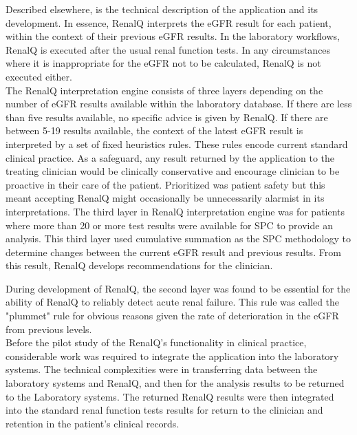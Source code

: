 \documentclass[11pt]{article}
\begin{document}
Described elsewhere, is the technical description of the application and its development\citep{GodfreyEtAl2014KidneyPaper}. In essence, RenalQ interprets the eGFR result for each patient, within the context of their previous eGFR results. In the laboratory workflows, RenalQ is executed after the usual renal function tests. In any circumstances where it is inappropriate for the eGFR not to be calculated, RenalQ is not executed either. \\

The RenalQ interpretation engine consists of three layers depending on the number of eGFR results available within the laboratory database. If there are less than five results available, no specific advice is given by RenalQ. If there are between 5-19 results available, the context of the latest eGFR result is interpreted by a set of fixed heuristics rules. These rules encode current standard clinical practice. As a safeguard, any result returned by the application to the treating clinician would be clinically conservative and encourage clinician to be proactive in their care of the patient. Prioritized was patient safety but this meant accepting RenalQ might occasionally be unnecessarily alarmist in its interpretations. The third layer in RenalQ interpretation engine was for patients where more than 20 or more test results were available for SPC to provide an analysis. This third layer used cumulative summation as the SPC methodology to determine changes between the current eGFR result and previous results. From this result, RenalQ develops recommendations for the clinician.  

During development of RenalQ, the second layer was found to be essential for the ability of RenalQ to reliably detect acute renal failure. This rule was called the "plummet" rule for obvious reasons given the rate of deterioration in the eGFR from previous levels. \\

Before the pilot study of the RenalQ's functionality in clinical practice, considerable work was required to integrate the application into the laboratory systems. The technical complexities were in transferring data between the laboratory systems and RenalQ,  and then for the analysis results to be returned to the Laboratory systems.  The returned RenalQ results were then integrated into the standard renal function tests results for return to the clinician and retention in the patient's clinical records. \\
\end{document}
